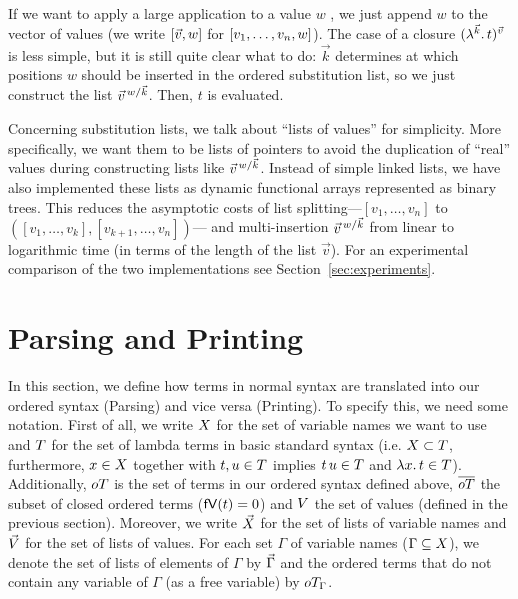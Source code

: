 \documentclass[submission,copyright,creativecommons]{eptcs}
\begin{document}
If we want to apply a large application to a value $w$  , we just append $w$ to the vector of values (we write $\ve{\vec v, w}$ for $\ve{v_1, \ldots, v_n, w}$). 
The case of a closure $\Val {\vec k} t {\vec v}$  is less simple, but it is still quite clear what to do: $\vec k$ determines at which positions $w$ should be inserted in the ordered substitution list, so we just construct the list $\multiinsert {\vec v} {\vec k} w$. Then, $t$ is evaluated.


Concerning substitution lists, we talk about ``lists of values'' for
simplicity. More specifically, we want them to be lists of pointers to
avoid the duplication of ``real'' values during constructing lists
like $\multiinsert {\vec v} {\vec k} {w}$. 
Instead of simple linked lists,
we have also implemented these lists as dynamic functional arrays
represented as binary trees.  This reduces the asymptotic costs of
list splitting---$[v_1,\dots,v_n]$ to
$([v_1,\dots,v_k],[v_{k+1},\dots,v_n])$---
and multi-insertion $\multiinsert {\vec v} {\vec k} w$ 
from linear to logarithmic time (in terms of the length of the list
$\vec v$).  For an
experimental comparison of the two implementations
see Section~\ref{sec:experiments}.


\section{Parsing and Printing}
\label{sec:parsing}

In this section, we define how terms in normal syntax are translated into our ordered syntax (Parsing) and vice versa (Printing). 
To specify this, we need some notation. 
First of all, we write $\x$ for the set of variable names we want to use and $\te$ for the set of lambda terms in basic standard syntax (i.e. $\x \subset \te$, furthermore, $x \in \x$ together with $t, u \in \te$ implies $\ApA t u \in \te$ and $\LaA x t \in \te$). Additionally, $\ot$ is the set of terms in our ordered syntax defined above, $\otc$ the subset of closed ordered terms ($\freevars t = 0$) and $\va$ the set of values (defined in the previous section).
Moreover, we write $\xl$ for the set of lists of variable names and $\vl$ for the set of lists of values. 
For each set $\Gamma$ of variable names ($\Gamma \subseteq \x$), we denote the set of lists of elements of $\Gamma$ by $\gl$ and the ordered terms that do not contain any variable of $\Gamma$ (as a free variable) by $\otw$.
\end{document}
